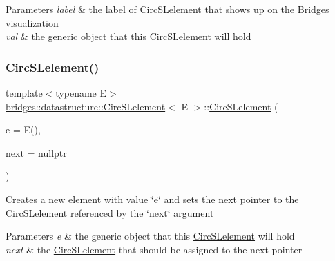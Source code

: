 \begin{DoxyParams}{Parameters}
{\em label} & the label of \hyperlink{classbridges_1_1datastructure_1_1_circ_s_lelement}{Circ\+S\+Lelement} that shows up on the \hyperlink{classbridges_1_1_bridges}{Bridges} visualization \\
\hline
{\em val} & the generic object that this \hyperlink{classbridges_1_1datastructure_1_1_circ_s_lelement}{Circ\+S\+Lelement} will hold \\
\hline
\end{DoxyParams}
\mbox{\label{classbridges_1_1datastructure_1_1_circ_s_lelement_aaedaa1d980bd5a66511b57cd20a8d94c}} 
\subsubsection{\texorpdfstring{Circ\+S\+Lelement()}{CircSLelement()}\hspace{0.1cm}{\footnotesize\ttfamily [3/4]}}
{\footnotesize\ttfamily template$<$typename E$>$ \\
\hyperlink{classbridges_1_1datastructure_1_1_circ_s_lelement}{bridges\+::datastructure\+::\+Circ\+S\+Lelement}$<$ E $>$\+::\hyperlink{classbridges_1_1datastructure_1_1_circ_s_lelement}{Circ\+S\+Lelement} (\begin{DoxyParamCaption}\item[{E}]{e = {\ttfamily E()},  }\item[{\hyperlink{classbridges_1_1datastructure_1_1_circ_s_lelement}{Circ\+S\+Lelement}$<$ E $>$ $\ast$}]{next = {\ttfamily nullptr} }\end{DoxyParamCaption})\hspace{0.3cm}{\ttfamily [inline]}}

Creates a new element with value \char`\"{}e\char`\"{} and sets the next pointer to the \hyperlink{classbridges_1_1datastructure_1_1_circ_s_lelement}{Circ\+S\+Lelement} referenced by the \char`\"{}next\char`\"{} argument


\begin{DoxyParams}{Parameters}
{\em e} & the generic object that this \hyperlink{classbridges_1_1datastructure_1_1_circ_s_lelement}{Circ\+S\+Lelement} will hold \\
\hline
{\em next} & the \hyperlink{classbridges_1_1datastructure_1_1_circ_s_lelement}{Circ\+S\+Lelement} that should be assigned to the next pointer \\
\hline
\end{DoxyParams}
\mbox{\label{classbridges_1_1datastructure_1_1_circ_s_lelement_a89f06ba76b1fdf1d2343c5f18f226722}} 
